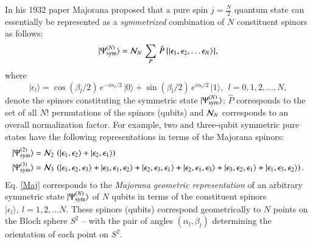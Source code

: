{In his 1932 paper \cite{majorana} Majorana proposed that a pure spin $j=\frac{N}{2}$ quantum state can essentially be represented as a {\em symmetrized} combination of $N$ constituent spinors as follows:  
\begin{equation}
\vert \Psi^{(N)}_{\rm sym}\rangle={\cal N}_N\, \sum_{P}\, \hat{P}\, \{\vert \epsilon_1, \epsilon_2, \ldots  \epsilon_N \rangle\}, \label{Maj}
\end{equation} 
where 
\begin{equation}
\vert\epsilon_l\rangle= \cos(\beta_l/2)\, e^{-i\alpha_l/2}\, \vert 0\rangle +\sin(\beta_l/2)\, e^{i\alpha_l/2} \, \vert 1\rangle,\ \ l=0,1,2,\ldots, N,\label{spinor}
\end{equation}
denote the spinors constituting the symmetric state $\vert \Psi^{(N)}_{\rm sym}\rangle$; $\hat{P}$ corresponds to the set of all $N!$ permutations of the spinors (qubits) and ${\cal N}_N$ corresponds to an overall normalization factor. For example, two and three-qubit symmetric pure states have the following representations in terms of the Majorana spinors:
\begin{align*}
\vert \Psi^{(2)}_{\rm sym}\rangle &={\cal N}_2\,  \left(\vert \epsilon_1, 
 \epsilon_2\rangle+  \vert \epsilon_2,\epsilon_1\rangle\right)\\
\vert \Psi^{(3)}_{\rm sym}\rangle &={\cal N}_3\,\left(  \vert \epsilon_1,
 \epsilon_2, \epsilon_3\rangle+  \vert \epsilon_3,\epsilon_1, \epsilon_2\rangle  + \vert \epsilon_2, 
 \epsilon_3, \epsilon_1\rangle +\vert \epsilon_2,\epsilon_1,\epsilon_3\rangle+
 \vert \epsilon_3,\epsilon_2,\epsilon_1\rangle+ 
 \vert \epsilon_1, \epsilon_3, \epsilon_2\rangle \right).
\end{align*}
Eq. \eqref{Maj} corresponds to the {\em Majorana geometric representation} of an arbitrary symmetric state $\vert \Psi^{(N)}_{\rm sym}\rangle$ of $N$ qubits in terms of the constituent spinors $\vert \epsilon_l \rangle,\  l=1,2,\ldots N$. These spinors (qubits) correspond geometrically to $N$ points on the  Bloch sphere $S^2$ \cite{makela,jpa4,markham1,markham2,gebastin, markham3} -- with the pair of angles $(\alpha_l,\beta_l)$ determining the orientation of each point on $S^2$.

}
